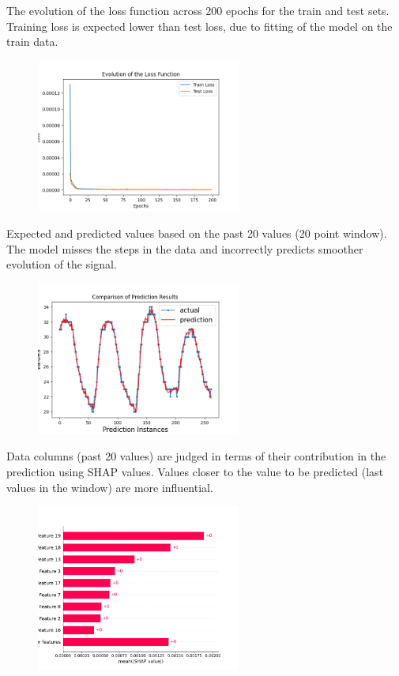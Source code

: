 \documentclass{foxelas_report}
\begin{document}
The evolution of the loss function across 200 epochs for the train and test sets. Training loss is expected lower than test loss, due to fitting of the model on the train data. 

\begin{figure}[H]
\includegraphics[width=0.6\textwidth]{case1_model_loss.png}
\end{figure}

Expected and predicted values based on the past 20 values (20 point window). The model misses the steps in the data and incorrectly predicts smoother evolution of the signal. 

\begin{figure}[H]
\includegraphics[width=0.6\textwidth]{case1_predictions.png}
\end{figure}

Data columns (past 20 values) are judged in terms of their contribution in the prediction using SHAP values. Values closer to the value to be predicted (last values in the window) are more influential. 

\begin{figure}[H]
\includegraphics[width=0.6\textwidth]{case1_shap_values.png}
\end{figure}
\end{document}
